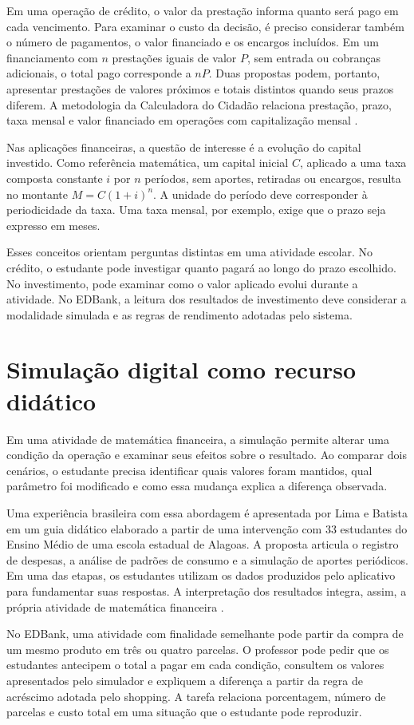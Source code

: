 Em uma operação de crédito, o valor da prestação informa quanto
será pago em cada vencimento. Para examinar o custo da decisão,
é preciso considerar também o número de pagamentos, o valor
financiado e os encargos incluídos. Em um financiamento com
\(n\) prestações iguais de valor \(P\), sem entrada ou cobranças
adicionais, o total pago corresponde a \(nP\). Duas propostas
podem, portanto, apresentar prestações de valores próximos e
totais distintos quando seus prazos diferem. A metodologia da
Calculadora do Cidadão relaciona prestação, prazo, taxa mensal
e valor financiado em operações com capitalização mensal
\cite{bcbMetodologiaFixas}.

Nas aplicações financeiras, a questão de interesse é a evolução
do capital investido. Como referência matemática, um capital
inicial \(C\), aplicado a uma taxa composta constante \(i\) por
\(n\) períodos, sem aportes, retiradas ou encargos, resulta no
montante \(M=C(1+i)^n\). A unidade do período deve corresponder
à periodicidade da taxa. Uma taxa mensal, por exemplo, exige que
o prazo seja expresso em meses.

Esses conceitos orientam perguntas distintas em uma atividade
escolar. No crédito, o estudante pode investigar quanto pagará
ao longo do prazo escolhido. No investimento, pode examinar como
o valor aplicado evolui durante a atividade. No EDBank, a leitura
dos resultados de investimento deve considerar a modalidade
simulada e as regras de rendimento adotadas pelo sistema.


\section{Simulação digital como recurso didático}
\label{sec-fundamentacao-simulacao}

Em uma atividade de matemática financeira, a simulação permite
alterar uma condição da operação e examinar seus efeitos sobre o
resultado. Ao comparar dois cenários, o estudante precisa identificar
quais valores foram mantidos, qual parâmetro foi modificado e como
essa mudança explica a diferença observada.

Uma experiência brasileira com essa abordagem é apresentada por
Lima e Batista em um guia didático elaborado a partir de uma
intervenção com 33 estudantes do Ensino Médio de uma escola estadual
de Alagoas. A proposta articula o registro de despesas, a análise de
padrões de consumo e a simulação de aportes periódicos. Em uma das
etapas, os estudantes utilizam os dados produzidos pelo aplicativo
para fundamentar suas respostas. A interpretação dos resultados
integra, assim, a própria atividade de matemática financeira
\cite{limaBatista2026}.

No EDBank, uma atividade com finalidade semelhante pode partir da
compra de um mesmo produto em três ou quatro parcelas. O professor
pode pedir que os estudantes antecipem o total a pagar em cada
condição, consultem os valores apresentados pelo simulador e
expliquem a diferença a partir da regra de acréscimo adotada pelo
shopping. A tarefa relaciona porcentagem, número de parcelas e
custo total em uma situação que o estudante pode reproduzir.